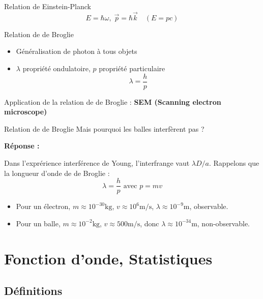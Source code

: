 \begin{Theorem}{Relation de Einstein-Planck}{}
        \[
          \boxed{E = \hbar \omega, \; \overrightarrow{p}  = \hbar \overrightarrow{k} \quad (E = pc)}
        \]
\end{Theorem}

\begin{Theorem}{Relation de de Broglie}{}
        \begin{itemize}
            \item Généralisation de photon à tous objets
            \item $\lambda$ propriété ondulatoire,  $p$ propriété particulaire
                 \[
                   \boxed{ \lambda = \frac{h}{p} }
                \]
        \end{itemize}
\end{Theorem}

Application de la relation de de Broglie : \textbf{SEM (Scanning electron microscope)}

\begin{question}{Relation de de Broglie}{}
Mais pourquoi les balles interfèrent pas ? 

\textbf{Réponse :} 

Dans l'exprérience interférence de Young, l'interfrange vaut $\lambda D/a$. Rappelons que la longueur d'onde de de Broglie :
    \[
    \lambda = \frac{h}{p} \text{ avec } p = mv
    \]
\begin{itemize}
    
    \item Pour un électron, $m \approx 10^{-30} \mathrm{kg} $, $v \approx 10^{6} \mathrm{m}/ \mathrm{s}$, $\lambda \approx 10^{-9} \mathrm{m}$, observable.
    \item Pour un balle, $m \approx 10^{-2} \mathrm{kg}$, $v \approx 500 \mathrm{m} / \mathrm{s}$, donc $\lambda \approx 10^{-34} \mathrm{m}$, non-observable.
\end{itemize}

\end{question}

\newpage
\section{Fonction d'onde, Statistiques}

\subsection{Définitions}

